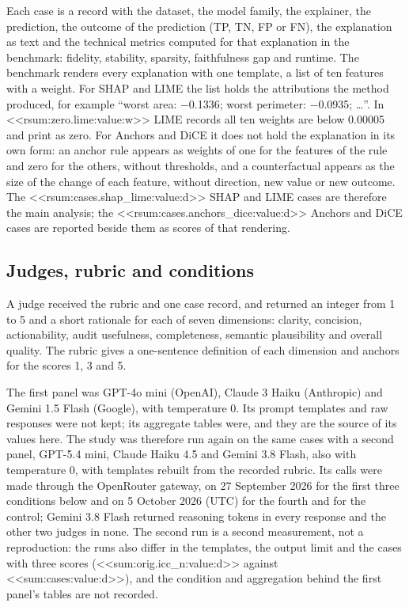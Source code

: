 \documentclass[12pt,letterpaper]{article}
\begin{document}
Each case is a record with the dataset, the model family, the explainer, the prediction,
the outcome of the prediction (TP, TN, FP or FN), the explanation as text and the
technical metrics computed for that explanation in the benchmark: fidelity, stability,
sparsity, faithfulness gap and runtime. The benchmark renders every explanation with one
template, a list of ten features with a weight. For SHAP and LIME the list holds the
attributions the method produced, for example ``worst area: $-$0.1336; worst perimeter:
$-$0.0935; \ldots''. In <<rsum:zero.lime:value:w>> LIME records all ten weights are
below 0.00005 and print as zero. For Anchors and DiCE it does not hold the explanation in its own
form: an anchor rule appears as weights of one for the features of the rule and zero for
the others, without thresholds, and a counterfactual appears as the size of the change
of each feature, without direction, new value or new outcome. The
<<rsum:cases.shap_lime:value:d>> SHAP and LIME cases are therefore the main analysis; the
<<rsum:cases.anchors_dice:value:d>> Anchors and DiCE cases are reported beside them as
scores of that rendering.

\subsection{Judges, rubric and conditions}

A judge received the rubric and one case record, and returned an integer from 1 to 5 and
a short rationale for each of seven dimensions: clarity, concision, actionability, audit
usefulness, completeness, semantic plausibility and overall quality. The rubric gives a
one-sentence definition of each dimension and anchors for the scores 1, 3 and 5.

The first panel was GPT-4o mini (OpenAI), Claude 3 Haiku (Anthropic) and Gemini 1.5
Flash (Google), with temperature 0. Its prompt templates and raw responses were not
kept; its aggregate tables were, and they are the source of its values here. The study
was therefore run again on the same cases with a second panel, GPT-5.4 mini, Claude Haiku
4.5 and Gemini 3.8 Flash, also with temperature 0, with templates rebuilt from the
recorded rubric. Its calls were made through the OpenRouter gateway, on 27 September 2026
for the first three conditions below and on 5 October 2026 (UTC) for the fourth and
for the control; Gemini 3.8
Flash returned reasoning tokens in every response and the other two judges in none. The
second run is a second measurement, not a reproduction: the runs also differ in the
templates, the output limit and the cases with three scores
(<<sum:orig.icc_n:value:d>> against <<sum:cases:value:d>>), and the condition and
aggregation behind the first panel's tables are not recorded.
\end{document}
